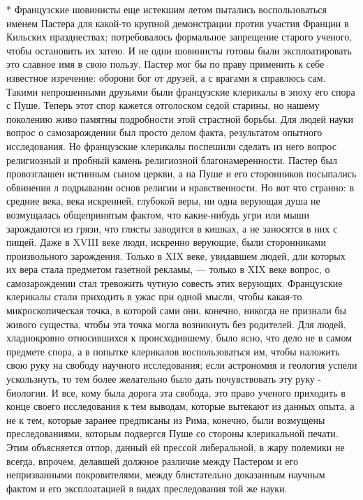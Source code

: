 * Французские шовинисты еще истекшим летом пытались воспользоваться
именем Пастера для какой-то крупной демонстрации против участия
Франции в Кильских празднествах; потребовалось формальное запрещение
старого ученого, чтобы остановить их затею. И не одни шовинисты готовы
были эксплоатировать это славное имя в свою пользу. Пастер мог бы по
праву применить к себе известное изречение: оборони бог от друзей, а с
врагами я справлюсь сам. Такими непрошенными друзьями были французские
клерикалы в эпоху его спора с Пуше. Теперь этот спор кажется
отголоском седой старины, но нашему поколению живо памятны подробности
этой страстной борьбы. Для людей науки вопрос о самозарождении был
просто делом факта, результатом опытного исследования. Но французские
клерикалы поспешили сделать из него вопрос религиозный и пробный
камень религиозной благонамеренности. Пастер был провозглашен истинным
сыном церкви, а на Пуше и его сторонников посыпались обвинения л
подрывании основ религии и нравственности. Но вот что странно: в
средние века, века искренней, глубокой веры, ни одна верующая душа не
возмущалась общепринятым фактом, что какие-нибудь угри или мыши
зарождаются из грязи, что глисты заводятся в кишках, а не заносятся в
них с пищей. Даже в XVIII веке люди, искренно верующие, были
сторонниками произвольного зарождения. Только в XIX веке, увидавшем
людей, дли которых их вера стала предметом газетной рекламы, --- только
в XIX веке вопрос, о самозарождении стал тревожить чутную совесть этих
верующих. Французские клерикалы стали приходить в ужас при одной
мысли, чтобы какая-то микроскопическая точка, в которой сами они,
конечно, никогда не признали бы живого существа, чтобы эта точка могла
возникнуть без родителей. Для людей, хладнокровно относившихся к
происходившему, было ясно, что дело не в самом предмете спора, а в
попытке клерикалов воспользоваться им, чтобы наложить свою руку на
свободу научного исследования; если астрономия и геология успели
ускользнуть, то тем более желательно было дать почувствовать эту руку
- биологии. И все, кому была дорога эта свобода, это право ученого
приходить в конце своего исследования к тем выводам, которые вытекают
из данных опыта, а не к тем, которые заранее предписаны из Рима,
конечно, были возмущены преследованиями, которым подвергся Пуше со
стороны клерикальной печати. Этим объясняется отпор, данный ей прессой
либеральной, в жару полемики не всегда, впрочем, делавшей должное
различие между Пастером и его непризванными покровителями, между
блистательно доказанным научным фактом и его эксплоатацией в видах
преследования той же науки.

